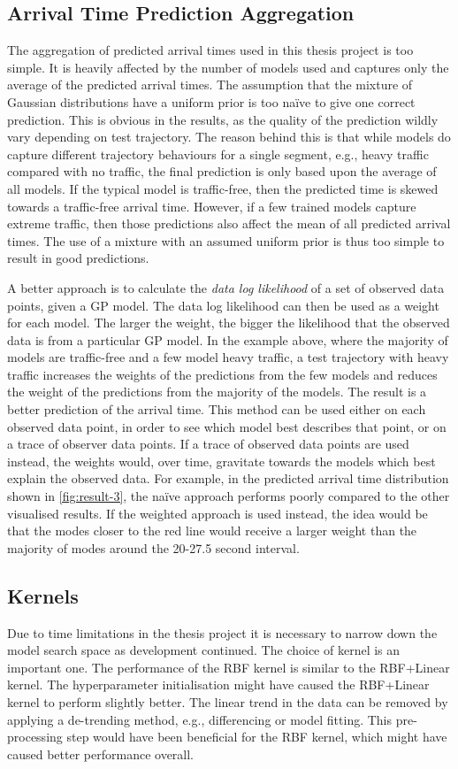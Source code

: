 \subsection{Arrival Time Prediction Aggregation}
The aggregation of predicted arrival times used in this thesis project is too simple.
It is heavily affected by the number of models used and captures only the average of the predicted arrival times.
The assumption that the mixture of Gaussian distributions have a uniform prior is too naïve to give one correct prediction.
This is obvious in the results, as the quality of the prediction wildly vary depending on test trajectory.
The reason behind this is that while models do capture different trajectory behaviours for a single segment, e.g., heavy traffic compared with no traffic, the final prediction is only based upon the average of all models.
If the typical model is traffic-free, then the predicted time is skewed towards a traffic-free arrival time.
However, if a few trained models capture extreme traffic, then those predictions also affect the mean of all predicted arrival times.
The use of a mixture with an assumed uniform prior is thus too simple to result in good predictions.

A better approach is to calculate the \textit{data log likelihood} of a set of observed data points, given a GP model.
The data log likelihood can then be used as a weight for each model.
The larger the weight, the bigger the likelihood that the observed data is from a particular GP model.
In the example above, where the majority of models are traffic-free and a few model heavy traffic, a test trajectory with heavy traffic increases the weights of the predictions from the few models and reduces the weight of the predictions from the majority of the models.
The result is a better prediction of the arrival time.
This method can be used either on each observed data point, in order to see which model best describes that point, or on a trace of observer data points.
If a trace of observed data points are used instead, the weights would, over time, gravitate towards the models which best explain the observed data.
For example, in the predicted arrival time distribution shown in \ref{fig:result-3}, the naïve approach performs poorly compared to the other visualised results.
If the weighted approach is used instead, the idea would be that the modes closer to the red line would receive a larger weight than the majority of modes around the 20-27.5 second interval.

\subsection{Kernels}
Due to time limitations in the thesis project it is necessary to narrow down the model search space as development continued.
The choice of kernel is an important one.
The performance of the RBF kernel is similar to the RBF+Linear kernel. 
The hyperparameter initialisation might have caused the RBF+Linear kernel to perform slightly better.
The linear trend in the data can be removed by applying a de-trending method, e.g., differencing or model fitting.
This pre-processing step would have been beneficial for the RBF kernel, which might have caused better performance overall.


